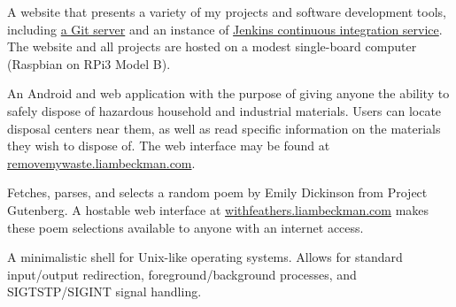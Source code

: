 \medbreak



A website that presents a variety of my projects and software development tools, including \href{https://git.liambeckman.com}{a Git server} and an instance of \href{https://liambeckman.com/jenkins}{Jenkins continuous integration service}. The website and all projects are hosted on a modest single-board computer (Raspbian on RPi3 Model B).

\myBreak


An Android and web application with the purpose of giving anyone the ability to safely dispose of hazardous household and industrial materials. Users can locate disposal centers near them, as well as read specific information on the materials they wish to dispose of. The web interface may be found at \textcolor{my-blue}{\href{https://removemywaste.liambeckman.com}{removemywaste.liambeckman.com}}.

\myBreak


Fetches, parses, and selects a random poem by Emily Dickinson from Project Gutenberg. A hostable web interface at \textcolor{my-blue}{\href{https://withfeathers.liambeckman.com}{withfeathers.liambeckman.com}} makes these poem selections available to anyone with an internet access.

\myBreak


A minimalistic shell for Unix-like operating systems. Allows for standard input/output redirection, foreground/background processes, and SIGTSTP/SIGINT signal handling.

